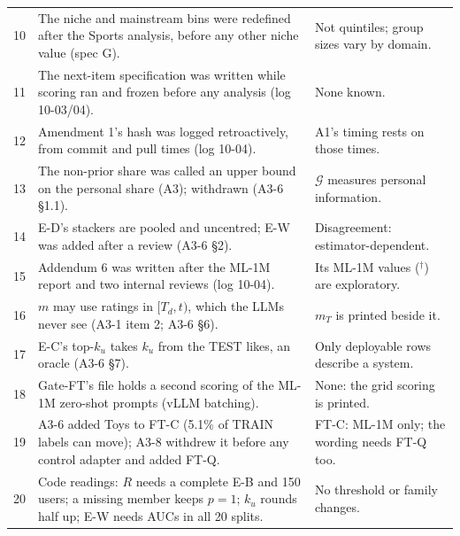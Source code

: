 \begin{table}[!htbp]
\begin{tabular}{@{}r>{\raggedright\arraybackslash}p{}>{\raggedright\arraybackslash}p{}@{}}
10 & The niche and mainstream bins were redefined after the Sports analysis, before any other niche value (spec G). & Not quintiles; group sizes vary by domain.\\
11 & The next-item specification was written while scoring ran and frozen before any analysis (log 10-03/04). & None known.\\
12 & Amendment 1's hash was logged retroactively, from commit and pull times (log 10-04). & A1's timing rests on those times.\\
13 & The non-prior share was called an upper bound on the personal share (A3); withdrawn (A3-6 \S1.1). & $\mathcal G$ measures personal information.\\
14 & E-D's stackers are pooled and uncentred; E-W was added after a review (A3-6 \S2). & Disagreement: estimator-dependent.\\
15 & Addendum 6 was written after the ML-1M report and two internal reviews (log 10-04). & Its ML-1M values ($^\dagger$) are exploratory.\\
16 & $m$ may use ratings in $[T_d,t)$, which the LLMs never see (A3-1 item 2; A3-6 \S6). & $m_T$ is printed beside it.\\
17 & E-C's top-$k_u$ takes $k_u$ from the TEST likes, an oracle (A3-6 \S7). & Only deployable rows describe a system.\\
18 & Gate-FT's file holds a second scoring of the ML-1M zero-shot prompts (vLLM batching). & None: the grid scoring is printed.\\
19 & A3-6 added Toys to FT-C (5.1\% of TRAIN labels can move); A3-8 withdrew it before any control adapter and added FT-Q. & FT-C: ML-1M only; the wording needs FT-Q too.\\
20 & Code readings: $R$ needs a complete E-B and 150 users; a missing member keeps $p=1$; $k_u$ rounds half up; E-W needs AUCs in all 20 splits. & No threshold or family changes.\\
\bottomrule
\end{tabular}
\end{table}


